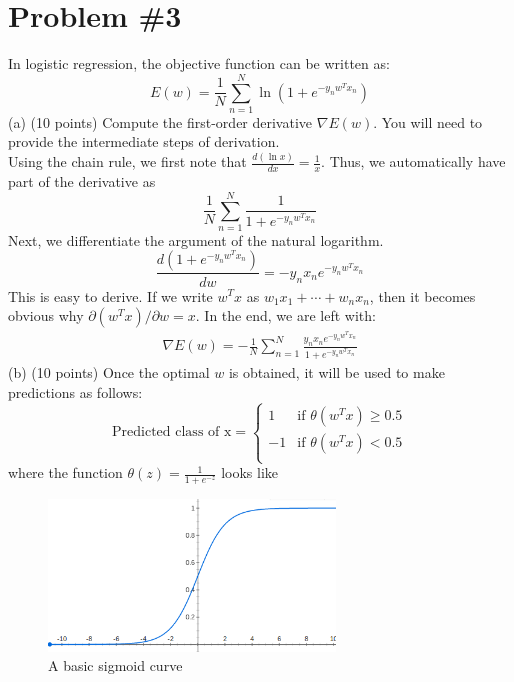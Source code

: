 \documentclass[12pt]{article}
\begin{document}
	\section*{Problem \#3}
	In logistic regression, the objective function can be written as:
	\begin{equation*}
	E(w)=\frac{1}{N} \sum_{n=1}^{N} \ln(1+e^{-y_nw^Tx_n})
	\end{equation*}
	(a) (10 points) Compute the first-order derivative $\nabla E(w)$. You will need to provide the intermediate steps of derivation.\\
	Using the chain rule, we first note that $\frac{d(\ln x)}{dx} = \frac{1}{x}$. Thus, we automatically have part of the derivative as
	\begin{equation*}
	\frac{1}{N} \sum_{n=1}^{N} \frac{1}{1+e^{-y_nw^Tx_n}}
	\end{equation*}
	Next, we differentiate the argument of the natural logarithm.
	\begin{equation*}
	\frac{d(1+e^{-y_nw^Tx_n})}{dw} = -y_n x_n e^{-y_nw^Tx_n}
	\end{equation*}
	This is easy to derive. If we write $w^T x$ as $w_1 x_1 + \cdots + w_n x_n$, then it becomes obvious why $\partial (w^T x) / \partial w = x$. In the end, we are left with:
	\begin{align*}
	\nabla E(w) = -\frac{1}{N} \sum_{n=1}^{N} \frac{y_n x_n e^{-y_nw^Tx_n}}{1+e^{-y_nw^Tx_n}}
	\end{align*}
	(b) (10 points) Once the optimal $w$ is obtained, it will be used to make predictions as follows:
	\begin{equation*}
	\text{Predicted class of x} = 
	\begin{cases}
	1 & \text{if } \theta(w^Tx) \ge 0.5 \\
	-1 & \text{if } \theta(w^Tx) < 0.5 \\
	\end{cases}
	\end{equation*}
	where the function $\theta(z) = \frac{1}{1+e^{-z}}$ looks like \\
	\begin{figure}[h]
		\begin{center}
			\includegraphics[width=3in]{sigmoid.png}
			\caption{A basic sigmoid curve}
			\label{fig:sigmoidEx}
		\end{center}
	\end{figure}
\end{document}

